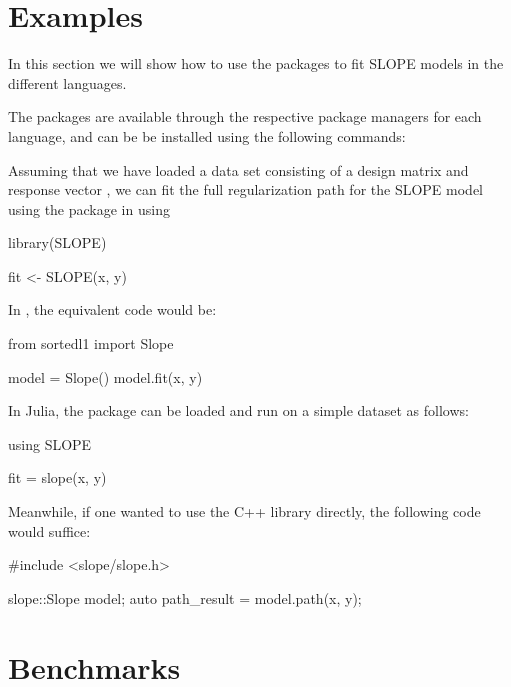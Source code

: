 \documentclass[article]{jss}
\begin{document}
\section{Examples}

In this section we will show how to use the packages to fit SLOPE models in
the different languages.

The packages are
available through the respective package managers for each language, and can be
be installed using the following commands:

\begin{description}[labelwidth=8ex]
  \item[\proglang{R}] 
  \item[\proglang{Python}] 
  \item[\proglang{Julia}] 
\end{description}

Assuming that we have loaded a data set consisting of a design
matrix  and response vector , we can fit the full regularization
path for the SLOPE model using the
 package in  using
\begin{Code}
  library(SLOPE)

  fit <- SLOPE(x, y)
\end{Code}

In , the equivalent code would be:
\begin{Code}
  from sortedl1 import Slope

  model = Slope()
  model.fit(x, y)
\end{Code}

In Julia, the package can be loaded and run on a simple dataset as follows:
\begin{Code}
  using SLOPE

  fit = slope(x, y)
\end{Code}

Meanwhile, if one wanted to use the C++ library directly, the following code
would suffice:
\begin{Code}
  #include <slope/slope.h>

  slope::Slope model;
  auto path_result = model.path(x, y);
\end{Code}

\section{Benchmarks}
\end{document}
